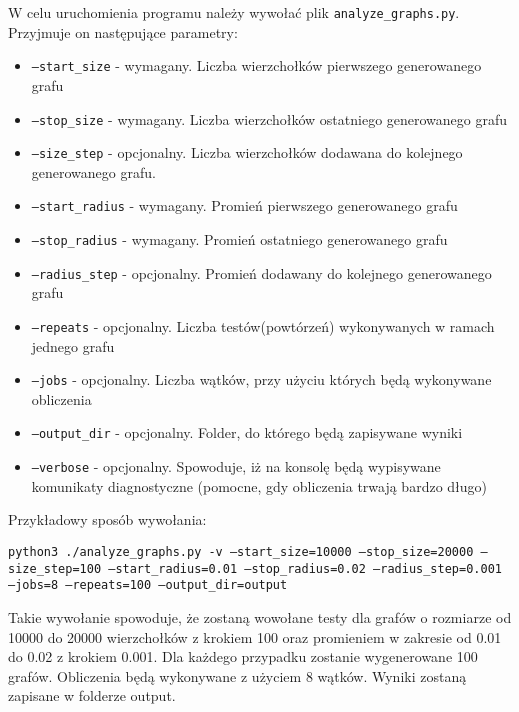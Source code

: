 		\noindent W celu uruchomienia programu należy wywołać plik \texttt{analyze\_graphs.py}. Przyjmuje on następujące parametry:
		\begin{itemize}
			\item \texttt{---start\_size} - wymagany. Liczba wierzchołków pierwszego generowanego grafu

			\item \texttt{---stop\_size} - wymagany. Liczba wierzchołków ostatniego generowanego grafu

			\item \texttt{---size\_step} - opcjonalny. Liczba wierzchołków dodawana do kolejnego generowanego grafu.

			\item \texttt{---start\_radius} - wymagany. Promień pierwszego generowanego grafu

			\item \texttt{---stop\_radius} - wymagany. Promień ostatniego generowanego grafu

			\item \texttt{---radius\_step} - opcjonalny. Promień dodawany do kolejnego generowanego grafu

			\item \texttt{---repeats} - opcjonalny. Liczba testów(powtórzeń) wykonywanych w ramach jednego grafu

			\item \texttt{---jobs} - opcjonalny. Liczba wątków, przy użyciu których będą wykonywane obliczenia

			\item \texttt{---output\_dir} - opcjonalny. Folder, do którego będą zapisywane wyniki

			\item \texttt{---verbose} - opcjonalny. Spowoduje, iż na konsolę będą wypisywane komunikaty diagnostyczne (pomocne, gdy obliczenia trwają bardzo długo)
		\end{itemize}

		Przykładowy sposób wywołania:

		\texttt{python3 ./analyze\_graphs.py -v ---start\_size=10000 ---stop\_size=20000 ---size\_step=100 ---start\_radius=0.01 ---stop\_radius=0.02 ---radius\_step=0.001 ---jobs=8 ---repeats=100 ---output\_dir=output}

		Takie wywołanie spowoduje, że zostaną wowołane testy dla grafów o rozmiarze od 10000 do 20000 wierzchołków z krokiem 100 oraz promieniem w zakresie od 0.01 do 0.02 z krokiem 0.001. Dla każdego przypadku zostanie wygenerowane 100 grafów. Obliczenia będą wykonywane z użyciem 8 wątków. Wyniki zostaną zapisane w folderze output.
